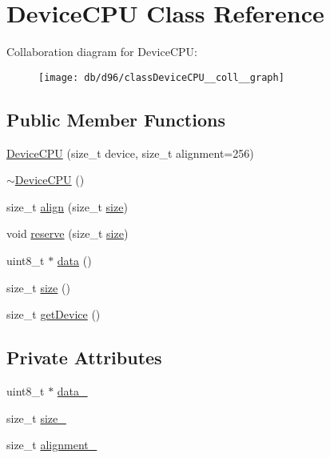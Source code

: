 \hypertarget{classDeviceCPU}{}\section{Device\+C\+PU Class Reference}
\label{classDeviceCPU}


Collaboration diagram for Device\+C\+PU\+:
\nopagebreak
\begin{figure}[H]
\begin{center}
\leavevmode
\texttt{[image: db/d96/classDeviceCPU\_\_coll\_\_graph]}
\end{center}
\end{figure}
\subsection*{Public Member Functions}
\begin{DoxyCompactItemize}
\item 
\hyperlink{classDeviceCPU_acc3a2e8a88179459a4a46d0372deb4b4}{Device\+C\+PU} (size\+\_\+t device, size\+\_\+t alignment=256)
\item 
\hyperlink{classDeviceCPU_a19924f8ccde58531dd6e2e1b2c63948c}{$\sim$\+Device\+C\+PU} ()
\item 
size\+\_\+t \hyperlink{classDeviceCPU_a645be50c4147bf92c0f3bb3b1f5dc19e}{align} (size\+\_\+t \hyperlink{classDeviceCPU_a7d0c88aa549974bb767c40d21b990167}{size})
\item 
void \hyperlink{classDeviceCPU_ad86a817a1e6d8e56ce39ceaf0c61ba27}{reserve} (size\+\_\+t \hyperlink{classDeviceCPU_a7d0c88aa549974bb767c40d21b990167}{size})
\item 
uint8\+\_\+t $\ast$ \hyperlink{classDeviceCPU_a403496227a13cdd58b4ecbb4b11cc802}{data} ()
\item 
size\+\_\+t \hyperlink{classDeviceCPU_a7d0c88aa549974bb767c40d21b990167}{size} ()
\item 
size\+\_\+t \hyperlink{classDeviceCPU_a7b66f203a6bef405b888ec808381d41f}{get\+Device} ()
\end{DoxyCompactItemize}
\subsection*{Private Attributes}
\begin{DoxyCompactItemize}
\item 
uint8\+\_\+t $\ast$ \hyperlink{classDeviceCPU_a90432e8ebf17e7b2eb184a47bee74bf5}{data\+\_\+}
\item 
size\+\_\+t \hyperlink{classDeviceCPU_a6e8ad38cd656798fa20752238dcd1c83}{size\+\_\+}
\item 
size\+\_\+t \hyperlink{classDeviceCPU_a933ca67a884aa78d97d535ac519dbb21}{alignment\+\_\+}
\end{DoxyCompactItemize}


